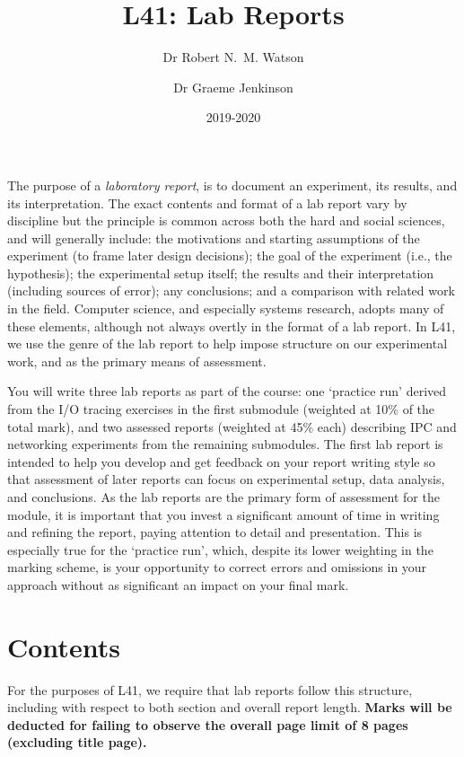 \documentclass[a4paper,10pt]{article}
\begin{document}
\title{L41: Lab Reports}
\author{Dr Robert N.~M. Watson \and Dr Graeme Jenkinson}
\date{2019-2020}
\maketitle

The purpose of a \textit{laboratory report}, is to document an experiment, its
results, and its interpretation.
The exact contents and format of a lab report vary by discipline but the
principle is common across both the hard and social sciences, and will
generally include: the motivations and starting assumptions of the experiment
(to frame later design decisions); the goal of the experiment (i.e., the
hypothesis); the experimental setup itself; the results and their
interpretation (including sources of error); any conclusions; and a
comparison with related work in the field.
Computer science, and especially systems research, adopts many of these
elements, although not always overtly in the format of a lab report.
In L41, we use the genre of the lab report to help impose structure on our
experimental work, and as the primary means of assessment.

You will write three lab reports as part of the course: one `practice run'
derived from the I/O tracing exercises in the first submodule (weighted at
10\% of the total mark), and two assessed reports (weighted at 45\% each)
describing IPC and networking experiments from the remaining submodules.
The first lab report is intended to help you develop and get feedback on your
report writing style so that assessment of later reports can focus on
experimental setup, data analysis, and conclusions.
As the lab reports are the primary form of assessment for the module, it is
important that you invest a significant amount of time in writing and refining
the report, paying attention to detail and presentation.
This is especially true for the `practice run', which, despite its lower
weighting in the marking scheme, is your opportunity to correct errors and
omissions in your approach without as significant an impact on your final
mark.

\section*{Contents}

For the purposes of L41, we require that lab reports follow this structure,
including with respect to both section and overall report length.
\textbf{Marks will be deducted for failing to observe the overall page limit
of 8 pages (excluding title page).}
\end{document}
